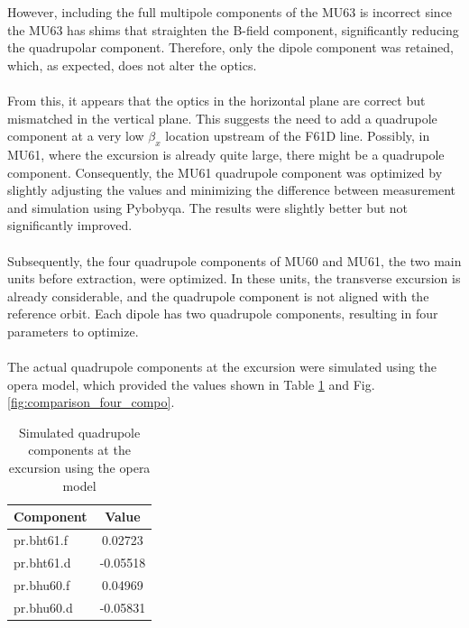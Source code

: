 However, including the full multipole components of the MU63 is incorrect since the MU63 has shims that straighten the B-field component, significantly reducing the quadrupolar component. Therefore, only the dipole component was retained, which, as expected, does not alter the optics.
\\
\\
From this, it appears that the optics in the horizontal plane are correct but mismatched in the vertical plane. This suggests the need to add a quadrupole component at a very low $\beta_{x}$ location upstream of the F61D line. Possibly, in MU61, where the excursion is already quite large, there might be a quadrupole component. Consequently, the MU61 quadrupole component was optimized by slightly adjusting the values and minimizing the difference between measurement and simulation using Pybobyqa. The results were slightly better but not significantly improved.
\\
\\
Subsequently, the four quadrupole components of MU60 and MU61, the two main units before extraction, were optimized. In these units, the transverse excursion is already considerable, and the quadrupole component is not aligned with the reference orbit. Each dipole has two quadrupole components, resulting in four parameters to optimize.
\\
\\
The actual quadrupole components at the excursion were simulated using the opera model, which provided the values shown in Table \ref{tab:quadrupole_components} and Fig. \ref{fig:comparison_four_compo}.

\begin{table}[htbp]
\centering
\caption{Simulated quadrupole components at the excursion using the opera model}
\label{tab:quadrupole_components}
\begin{tabular}{|l|c|}
\hline
Component & Value \\
\hline
pr.bht61.f & 0.02723 \\
pr.bht61.d & -0.05518 \\
pr.bhu60.f & 0.04969 \\
pr.bhu60.d & -0.05831 \\
\hline
\end{tabular}
\end{table}


